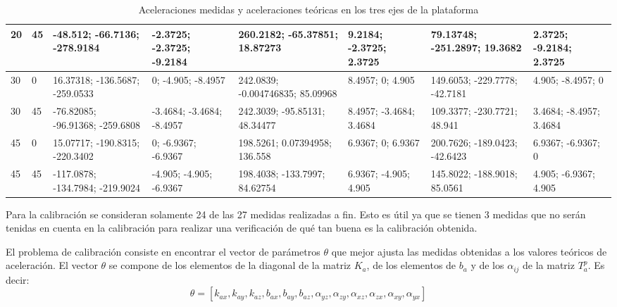 \documentclass[spanish,12pt,a4paper,titlepage]{report}
\begin{document}
\begin{table}[H]
\begin{tiny}
\begin{tabular}{p{30pt}p{30pt}|p{40pt}|p{26pt}|p{40pt}|p{26pt}|p{40pt}|p{26pt}|}
\multicolumn{1}{|p{30pt}|}{20} & 45 &   -48.512;     -66.7136;    -278.9184 & -2.3725;    -2.3725;    -9.2184 & 260.2182;       -65.37851;     18.87273 & 9.2184;    -2.3725;    2.3725 & 79.13748;    -251.2897;     19.3682 & 2.3725;    -9.2184;    2.3725\\ \hline
\multicolumn{1}{|p{30pt}|}{30} & 0  &  16.37318;    -136.5687;    -259.0533 &       0;     -4.905;    -8.4957 & 242.0839;    -0.004746835;     85.09968 & 8.4957;          0;     4.905 & 149.6053;    -229.7778;    -42.7181 &  4.905;    -8.4957;         0\\ \hline
\multicolumn{1}{|p{30pt}|}{30} & 45 & -76.82085;    -96.91368;    -259.6808 & -3.4684;    -3.4684;    -8.4957 & 242.3039;       -95.85131;     48.34477 & 8.4957;    -3.4684;    3.4684 & 109.3377;    -230.7721;      48.941 & 3.4684;    -8.4957;    3.4684\\ \hline
\multicolumn{1}{|p{30pt}|}{45} & 0  &  15.07717;    -190.8315;    -220.3402 &       0;    -6.9367;    -6.9367 & 198.5261;      0.07394958;      136.558 & 6.9367;          0;    6.9367 & 200.7626;    -189.0423;    -42.6423 & 6.9367;    -6.9367;         0\\ \hline
\multicolumn{1}{|p{30pt}|}{45} & 45 & -117.0878;    -134.7984;    -219.9024 &  -4.905;     -4.905;    -6.9367 & 198.4038;       -133.7997;     84.62754 & 6.9367;     -4.905;     4.905 & 145.8022;    -188.9018;     85.0561 &  4.905;    -6.9367;     4.905\\ \hline


\end{tabular}
\caption{Aceleraciones medidas y aceleraciones teóricas en los tres ejes de la plataforma}
\label{tab:acc}
\end{tiny}
\end{table} 

Para la calibración se consideran solamente 24 de las 27 medidas realizadas a fin. Esto es útil ya que se tienen 3 medidas que no serán tenidas en cuenta en la calibración para realizar una verificación de qué tan buena es la calibración obtenida.

El problema de calibración consiste en encontrar el vector de parámetros $\theta$ que mejor ajusta las medidas obtenidas a los valores teóricos de aceleración. El vector $\theta$ se compone de los elementos de la diagonal de la matriz $K_a$, de los elementos de $b_a$ y de los $\alpha_{ij}$ de la matriz $T_a^p$. Es decir: $$\theta =\left[ k_{ax} , k_{ay} , k_{az} ,b_{ax} ,b_{ay} ,b_{az}, \alpha_{yz} , \alpha_{zy} , \alpha_{xz} , \alpha_{zx} , \alpha_{xy} , \alpha_{yx} \right]$$
\end{document}
